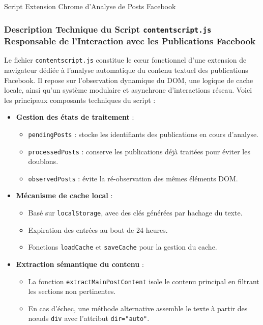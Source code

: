 \begin{description}
 
      \item Script Extension Chrome d'Analyse de Posts Facebook
 
\end{description}
 \begin{description}
  
\subsubsection{Description Technique du Script \texttt{contentscript.js} Responsable de l'Interaction avec les Publications Facebook}

Le fichier \texttt{contentscript.js} constitue le cœur fonctionnel d'une extension de navigateur dédiée à l’analyse automatique du contenu textuel des publications Facebook. Il repose sur l’observation dynamique du DOM, une logique de cache locale, ainsi qu’un système modulaire et asynchrone d’interactions réseau. Voici les principaux composants techniques du script :

\begin{itemize}
    \item \textbf{Gestion des états de traitement} :
    \begin{itemize}
        \item \texttt{pendingPosts} : stocke les identifiants des publications en cours d’analyse.
        \item \texttt{processedPosts} : conserve les publications déjà traitées pour éviter les doublons.
        \item \texttt{observedPosts} : évite la ré-observation des mêmes éléments DOM.
    \end{itemize}

    \item \textbf{Mécanisme de cache local} :
    \begin{itemize}
        \item Basé sur \texttt{localStorage}, avec des clés générées par hachage du texte.
        \item Expiration des entrées au bout de 24 heures.
        \item Fonctions \texttt{loadCache} et \texttt{saveCache} pour la gestion du cache.
    \end{itemize}

    \item \textbf{Extraction sémantique du contenu} :
    \begin{itemize}
        \item La fonction \texttt{extractMainPostContent} isole le contenu principal en filtrant les sections non pertinentes.
        \item En cas d’échec, une méthode alternative assemble le texte à partir des nœuds \texttt{div} avec l’attribut \texttt{dir="auto"}.
    \end{itemize}


\end{itemize}
\end{description}
